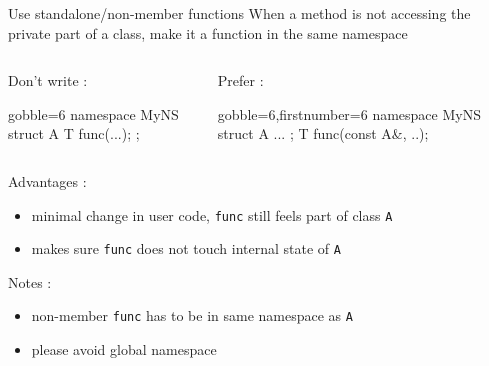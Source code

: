\begin{frame}[fragile]
  \begin{block}{Use standalone/non-member functions}
    When a method is not accessing the private part of a class, make it a function in the same namespace
    \vspace{-1mm}
    \begin{columns}[T]
      \begin{column}{.35\textwidth}
        Don't write :
        \vspace{-1mm}
        \begin{cppcode*}{gobble=6}
          namespace MyNS {
            struct A {
              T func(...);
            };
          }
        \end{cppcode*}
      \end{column}
      \begin{column}{.35\textwidth}
        Prefer :
        \vspace{-1mm}
        \begin{cppcode*}{gobble=6,firstnumber=6}
          namespace MyNS {
            struct A { ... };
            T func(const A&, ..);
          }
        \end{cppcode*}
      \end{column}
    \end{columns}
    \vspace{.2cm}
    Advantages :
    \begin{itemize}
    \item minimal change in user code, \texttt{func} still feels part of class \texttt{A}
    \item makes sure \texttt{func} does not touch internal state of \texttt{A}
    \end{itemize}
    Notes :
    \begin{itemize}
    \item non-member \texttt{func} has to be in same namespace as \texttt{A}
    \item please avoid global namespace
    \end{itemize}
  \end{block}
\end{frame}

